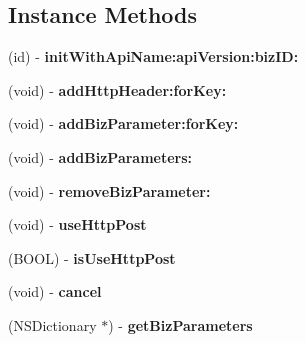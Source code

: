 \subsection*{Instance Methods}
\begin{DoxyCompactItemize}
\item 
\mbox{\label{interface_mtop_ext_request_a745b890a7aaa3dd2ac5d83e9e3814026}} 
(id) -\/ {\bfseries init\+With\+Api\+Name\+:api\+Version\+:biz\+I\+D\+:}
\item 
\mbox{\label{interface_mtop_ext_request_af489c2dc385d400f284e217b532d017d}} 
(void) -\/ {\bfseries add\+Http\+Header\+:for\+Key\+:}
\item 
\mbox{\label{interface_mtop_ext_request_a90a1e2200f3373d6f6ac4e122b20d8e0}} 
(void) -\/ {\bfseries add\+Biz\+Parameter\+:for\+Key\+:}
\item 
\mbox{\label{interface_mtop_ext_request_a838fb6e9917bd273c669489a76c2db62}} 
(void) -\/ {\bfseries add\+Biz\+Parameters\+:}
\item 
\mbox{\label{interface_mtop_ext_request_ae9378f7c48fa634ca95b579237f8bd3d}} 
(void) -\/ {\bfseries remove\+Biz\+Parameter\+:}
\item 
\mbox{\label{interface_mtop_ext_request_a88cf42c97a17e7af0a5608385ea69470}} 
(void) -\/ {\bfseries use\+Http\+Post}
\item 
\mbox{\label{interface_mtop_ext_request_ad1f9333d187efb766db8739b8602d103}} 
(B\+O\+OL) -\/ {\bfseries is\+Use\+Http\+Post}
\item 
\mbox{\label{interface_mtop_ext_request_a0d97562e07b1d7710736b3645e496847}} 
(void) -\/ {\bfseries cancel}
\item 
\mbox{\label{interface_mtop_ext_request_aa6d3268f845bdc0cd3c837ed3522282a}} 
(N\+S\+Dictionary $\ast$) -\/ {\bfseries get\+Biz\+Parameters}
\end{DoxyCompactItemize}
